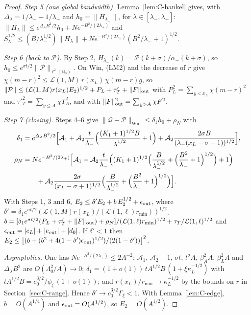\begin{proof}
\emph{Step 5 (one global bandwidth).} Lemma~\ref{lem:C-hankel} gives, with $\Delta_\lambda=1/\lambda_--1/\lambda_+$ and
$h_0=\|H_{\lambda_-}\|$, for $\lambda\in[\lambda_-,\lambda_+]$:
$\|H_\lambda\|\le e^{\Delta_\lambda B^2/2}h_0+Ne^{-B^2/(2\lambda_+)}$ and
$S_\lambda^{1/2}\le(B/\lambda_-^{1/2})\|H_\lambda\|+Ne^{-B^2/(2\lambda_+)}(B^2/\lambda_-+1)^{1/2}$.

\emph{Step 6 (back to $\mathcal P$).} By Step 2, $H_{\lambda_-}(k)=\mathcal P(k+\sigma)/\alpha_-(k+\sigma)$, so $h_0\le e^{\sigma t/2}\|\mathcal P\|_{\ell^2(\mathbb N_0)}$.
On $\mathrm{Win}$, (LM2) and the decrease of $r$ give $\chi(m-r)^2\le\mathcal L(1,M)\,r(x_L)\,\chi(m-r)g$, so
$\|\mathcal P\|\le(\mathcal L(1,M)r(x_L)E_2)^{1/2}+P_L+\tau'_T+\|F\|_{\rm out}$ with $P_L^2=\sum_{y<x_L}\chi(m-r)^2$ and $\tau'^2_T=\sum_{y\le A}\chi T_A^2$, and with $\|F\|^2_{\rm out}=\sum_{y>A}\chi F^2$.

\emph{Step 7 (closing).} Steps 4--6 give $\|\mathcal Q-\mathcal P\|_{\mathrm{Win}}\le\delta_1h_0+\rho_N$ with
\begin{align*}
\delta_1&=e^{\Delta_\lambda B^2/2}\Bigl[\mathcal A_1+\mathcal A_2\frac{t}{\lambda_-}\Bigl(\frac{(K_1+1)^{1/2}B}{\lambda_-^{1/2}}+1\Bigr)
+\mathcal A_2\frac{2\sigma B}{(\lambda_-(x_L-\sigma+1))^{1/2}}\Bigr],\\
\rho_N&=Ne^{-B^2/(2\lambda_+)}\Bigl[\mathcal A_1+\mathcal A_2\frac{t}{\lambda_-}\Bigl((K_1+1)^{1/2}\Bigl(\frac{B}{\lambda_-^{1/2}}+\Bigl(\frac{B^2}{\lambda_-}+1\Bigr)^{1/2}\Bigr)+1\Bigr)\\
&\qquad+\mathcal A_2\frac{2\sigma}{(x_L-\sigma+1)^{1/2}}\Bigl(\frac{B}{\lambda_-^{1/2}}+\Bigl(\frac{B^2}{\lambda_-}+1\Bigr)^{1/2}\Bigr)\Bigr].
\end{align*}
With Steps 1, 3 and 6, $E_2\le\delta'E_2+b\,E_2^{1/2}+\epsilon_{\rm out}$, where
$\delta'=\delta_1e^{\sigma t/2}(\mathcal L(1,M)r(x_L)/(\mathcal L(1,\ell)r_{\min}))^{1/2}$,
$b=[\delta_1e^{\sigma t/2}(P_L+\tau'_T+\|F\|_{\rm out})+\rho_N]/(\mathcal L(1,\ell)r_{\min})^{1/2}+\tau_T/\mathcal L(1,\ell)^{1/2}$ and
$\epsilon_{\rm out}=|e_L|+|e_{\rm out}|+|d_0|$. If $\delta'<1$ then
$E_2\le\bigl[(b+(b^2+4(1-\delta')\epsilon_{\rm out})^{1/2})/(2(1-\delta'))\bigr]^2$.

\emph{Asymptotics.} One has $Ne^{-B^2/(2\lambda_+)}\le2A^{-2}$; $\mathcal A_1$, $\mathcal A_2-1$, $\sigma t$, $t^2A$, $\beta_A^2A$, $\beta_L^2A$ and
$\Delta_\lambda B^2$ are $O(\Lambda_0^2/A)\to0$; $\delta_1=(1+o(1))\,tA^{1/2}B\,(1+\xi\kappa_L^{-1/2})$ with
$tA^{1/2}B=c_0^{3/2}/\phi_\xi\,(1+o(1))$; and $r(x_L)/r_{\min}\to\kappa_L^{-1/2}$ by the bounds on $r$ in Section~\ref{sec:C-range}.
Hence $\delta'\to c_0^{3/2}\Gamma_\xi<1$. With Lemma~\ref{lem:C-edge}, $b=O(A^{1/4})$ and $\epsilon_{\rm out}=O(A^{1/2})$, so
$E_2=O(A^{1/2})$.
\end{proof}

